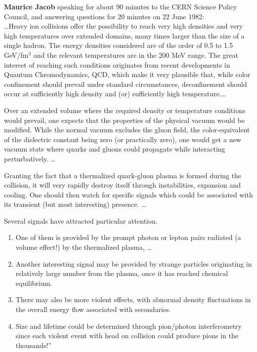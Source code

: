 \begin{mdframed}[linecolor=gray,roundcorner=12pt,backgroundcolor=GreenYellow!15,linewidth=1pt,leftmargin=0cm,rightmargin=0cm,topline=true,bottomline=true,skipabove=12pt]\relax%
%
{\bf Maurice Jacob} speaking for about 90 minutes to the CERN Science Policy Council, and answering questions for 20 minutes on 22 June 1982:\\

\ldots Heavy ion collisions offer the possibility to reach very high densities and very high temperatures over extended domains, many times larger than the size of a single hadron. The energy densities considered are of the order of 0.5 to 1.5 GeV/fm$^3$ and the relevant temperatures are in the 200 MeV range. The great interest of reaching such conditions originates from recent developments in Quantum Chromodynamics, QCD, which make it very plausible that, while color confinement should prevail under standard circumstances, deconfinement should occur at sufficiently high density and (or) sufficiently high temperature.\ldots 

Over an extended volume where the required density or temperature conditions would prevail, one expects that the properties of the physical vacuum would be modified. While the normal vacuum excludes the gluon field, the color-equivalent of the dielectric constant being zero (or practically zero), one would get a new vacuum state where quarks and gluons could propagate while interacting perturbatively. \ldots 

Granting the fact that a thermalized quark-gluon plasma is formed during the collision, it will very rapidly destroy itself through instabilities, expansion and cooling. One should then watch for specific signals which could be associated with its transient (but most interesting) presence. \ldots

Several signals have attracted particular 
attention.
\begin{enumerate}
\item One of them is provided by the prompt photon or lepton pairs radiated (a volume effect!) by the thermalized plasma, \ldots 
\item 
Another interesting signal may be provided by strange particles originating in relatively large number from the plasma, once it has reached chemical equilibrium. 
\item
There may also be more violent effects, with abnormal density fluctuations in the overall energy flow associated with secondaries. 
\item
Size and lifetime could be determined through pion/photon interferometry since each violent event with head on collision could produce pions in the thousands!''
\end{enumerate} 


\end{mdframed}

